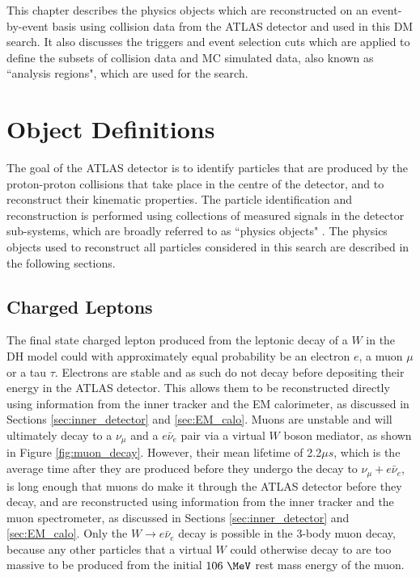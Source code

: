 \label{chapter:objects}

This chapter describes the physics objects which are reconstructed on an event-by-event basis using collision data from the ATLAS detector and used in this DM search. It also discusses the triggers and event selection cuts which are applied to define the subsets of collision data and MC simulated data, also known as ``analysis regions", which are used for the search. 

\section{Object Definitions}
\label{sec:object_defs}

The goal of the ATLAS detector is to identify particles that are produced by the proton-proton collisions that take place in the centre of the detector, and to reconstruct their kinematic properties. The particle identification and reconstruction is performed using collections of measured signals in the detector sub-systems, which are broadly referred to as ``physics objects" \cite{physics_objects_atlas_2013}. The physics objects used to reconstruct all particles considered in this search are described in the following sections.

\subsection{Charged Leptons}
\label{sec:charged_leptons}

The final state charged lepton produced from the leptonic decay of a \(W\) in the DH model could with approximately equal probability \cite{PDG_2018} be an electron \(e\), a muon \(\mu\) or a tau \(\tau\). Electrons are stable and as such do not decay before depositing their energy in the ATLAS detector. This allows them to be reconstructed directly using information from the inner tracker and the EM calorimeter, as discussed in Sections \ref{sec:inner_detector} and \ref{sec:EM_calo}. Muons are unstable and will ultimately decay to a \(\nu_\mu\) and a \(e\bar{\nu}_e\) pair via a virtual \(W\) boson mediator, as shown in Figure \ref{fig:muon_decay}. However, their mean lifetime of 2.2\(\mu s\), which is the average time after they are produced before they undergo the decay to \(\nu_\mu+e\bar{\nu}_e\), is long enough that muons do make it through the ATLAS detector before they decay, and are reconstructed using information from the inner tracker and the muon spectrometer, as discussed in Sections \ref{sec:inner_detector} and \ref{sec:EM_calo}. Only the \(W\rightarrow e\bar{\nu}_e\) decay is possible in the 3-body muon decay, because any other particles that a virtual \(W\) could otherwise decay to are too massive to be produced from the initial \(106~\MeV\) rest mass energy of the muon. 

